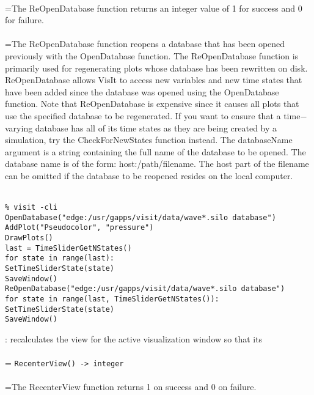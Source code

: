 \documentclass[10pt,a4paper]{report}
\begin{document}
 \\ 
\hangindent=\parindent The ReOpenDatabase function returns an integer value of 1 for success and 0 for failure. \\[-3mm] 

 \\ 
\hangindent=\parindent The ReOpenDatabase function reopens a database that has been opened previously with the OpenDatabase function. The ReOpenDatabase function is primarily used for regenerating plots whose database has been rewritten on disk. ReOpenDatabase allows VisIt to access new variables and new time states that have been added since the database was opened using the OpenDatabase function. Note that ReOpenDatabase is expensive since it causes all plots that use the specified database to be regenerated. If you want to ensure that a time$-$varying database has all of its time states as they are being created by a simulation, try the CheckForNewStates function instead. The databaseName argument is a string containing the full name of the database to be opened. The database name is of the form: host:/path/filename. The host part of the filename can be omitted if the database to be reopened resides on the local computer. \\[-3mm] 

\\[-6mm]
\begin{verbatim}% visit -cli
OpenDatabase("edge:/usr/gapps/visit/data/wave*.silo database")
AddPlot("Pseudocolor", "pressure")
DrawPlots()
last = TimeSliderGetNStates()
for state in range(last):
SetTimeSliderState(state)
SaveWindow()
ReOpenDatabase("edge:/usr/gapps/visit/data/wave*.silo database")
for state in range(last, TimeSliderGetNStates()):
SetTimeSliderState(state)
SaveWindow()
\end{verbatim}
\newpage


{}
: recalculates the view for the active visualization window so that its\\[-3mm]

 \\ 
\hangindent=\parindent 
\verb!RecenterView() -> integer!\\ [-3mm]

 \\ 
\hangindent=\parindent The RecenterView function returns 1 on success and 0 on failure. \\[-3mm] 
\end{document}
